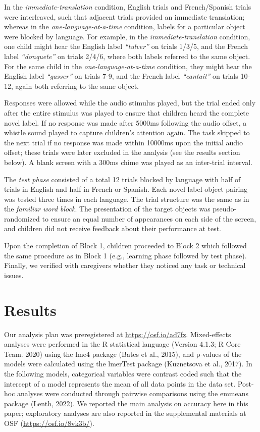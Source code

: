 \documentclass[
  man,floatsintext]{apa7}
\begin{document}
In the \emph{immediate-translation} condition, English trials and French/Spanish trials were interleaved, such that adjacent trials provided an immediate translation; whereas in the \emph{one-language-at-a-time} condition, labels for a particular object were blocked by language. For example, in the \emph{immediate-translation} condition, one child might hear the English label \emph{``tulver''} on trials 1/3/5, and the French label \emph{``donquete''} on trials 2/4/6, where both labels referred to the same object. For the same child in the \emph{one-language-at-a-time} condition, they might hear the English label \emph{``gasser''} on trials 7-9, and the French label \emph{``cantait''} on trials 10-12, again both referring to the same object.

Responses were allowed while the audio stimulus played, but the trial ended only after the entire stimulus was played to ensure that children heard the complete novel label. If no response was made after 5000ms following the audio offset, a whistle sound played to capture children's attention again. The task skipped to the next trial if no response was made within 10000ms upon the initial audio offset; these trials were later excluded in the analysis (see the results section below). A blank screen with a 300ms chime was played as an inter-trial interval.

The \emph{test phase} consisted of a total 12 trials blocked by language with half of trials in English and half in French or Spanish. Each novel label-object pairing was tested three times in each language. The trial structure was the same as in the \emph{familiar word block}. The presentation of the target objects was pseudo-randomized to ensure an equal number of appearances on each side of the screen, and children did not receive feedback about their performance at test.

Upon the completion of Block 1, children proceeded to Block 2 which followed the same procedure as in Block 1 (e.g., learning phase followed by test phase). Finally, we verified with caregivers whether they noticed any task or technical issues.

\hypertarget{results}{%
\section{Results}\label{results}}

Our analysis plan was preregistered at \url{https://osf.io/ad7fz}. Mixed-effects analyses were performed in the R statistical language (Version 4.1.3; R Core Team. 2020) using the lme4 package (Bates et al., 2015), and p-values of the models were calculated using the lmerTest package (Kuznetsova et al., 2017). In the following models, categorical variables were contrast coded such that the intercept of a model represents the mean of all data points in the data set. Post-hoc analyses were conducted through pairwise comparisons using the emmeans package (Lenth, 2022). We reported the main analysis on accuracy here in this paper; exploratory analyses are also reported in the supplemental materials at OSF (\url{https://osf.io/8vk3b/}).
\end{document}
